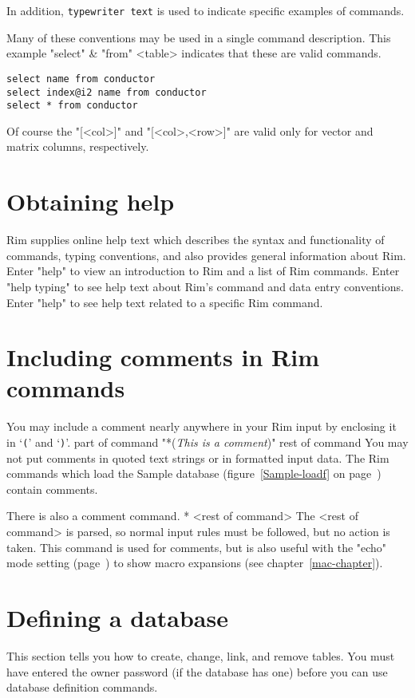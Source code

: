 In addition, {\tt typewriter text} is used to indicate specific
examples of commands.
 
Many of these conventions may be used in a single command description.
This example
\<"select" &
     "from" <table>\>
indicates that these are valid commands.
 
\code\begin{verbatim}
select name from conductor
select index@i2 name from conductor
select * from conductor
\end{verbatim}\endcode
 
Of course the "[<col>]" and
"[<col>,<row>]" are valid only for vector and matrix
columns, respectively.
 
 
\section{Obtaining help}
Rim supplies online help text which describes the
syntax and functionality of commands,
 typing conventions, and also provides general information about Rim.
Enter
\<"help"\>
to view an introduction to Rim and a list of Rim commands.
Enter
\<"help typing"\>
to see help text about Rim's command and data entry conventions.
Enter
\<"help" \>
to see help text related to a specific Rim command.
 
\section{Including comments in Rim commands}
%
You may include a comment nearly anywhere in your Rim input
by enclosing it in `{\tt*(}' and `{\tt )}'.
\< part of command  "*({\em This is a comment})"  rest of command \>
You may not put comments in quoted text strings or in formatted
input data.
The Rim commands which load the Sample database
(figure~\ref{Sample-loadf} on page~\pageref{Sample-loadf})
contain comments.
 
There is also a comment command.
\<* <rest of command> \>
The <rest of command> is parsed, so normal input rules must
be followed, but no action is taken.  This command is 
used for comments, but is also useful with the "echo" mode
setting (page~\pageref{echo-mode}) to show macro expansions
(see chapter~\ref{mac-chapter}).
 
\section{Defining a database}
\label{ocmd-section}
This section tells you how to create, change, link, and
remove tables.
You must have entered the owner password
(if the database has one) before you can use
database definition commands.
 
